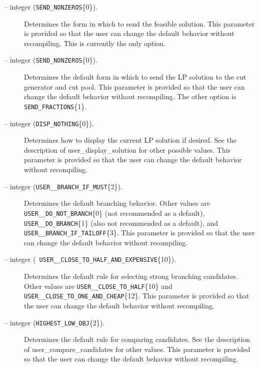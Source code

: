 \begin{description}
\item[ -- integer 
({\tt SEND\_NONZEROS}\{0\}).] 
Determines the form in which to send the feasible solution. This
parameter is provided so that the user can change the default behavior
without recompiling. This is currently the only option.

\item[ -- integer ({\tt SEND\_NONZEROS}\{0\}).] 
Determines the default form in which to send the LP solution to the
cut generator and cut pool. This
parameter is provided so that the user can change the default behavior
without recompiling. The other option is {\tt SEND\_FRACTIONS}\{1\}.

\item[ -- integer ({\tt DISP\_NOTHING}\{0\}).] 
Determines how to display the current LP solution if desired.
See the description of 
{user_display_solution} for other
possible values. This parameter is provided so that
the user can change the default behavior without recompiling.

\item[ -- integer 
({\tt USER\_\_BRANCH\_IF\_MUST}\{2\}).] 
Determines the default branching behavior. Other values are {\tt
USER\_\_DO\_NOT\_BRANCH}\{0\} (not recommended as a default), {\tt
USER\_\_DO\_BRANCH}\{1\} (also not recommended as a default), and {\tt
USER\_\_BRANCH\_IF\_TAILOFF}\{3\}. This
parameter is provided so that the user can change the default behavior
without recompiling.

\item[ -- integer ({\tt
USER\_\_CLOSE\_TO\_HALF\_AND\_EXPENSIVE}\{10\}).] 
Determines the default rule for selecting strong branching candidates.
Other values are {\tt USER\_\_CLOSE\_TO\_HALF}\{10\} and 
{\tt USER\_\_CLOSE\_TO\_ONE\_AND\_CHEAP}\{12\}. This
parameter is provided so that the user can change the default behavior
without recompiling.

\item[ -- integer 
({\tt HIGHEST\_LOW\_OBJ}\{2\}).] 
Determines the default rule for comparing candidates. See the
description of 
{user_compare_candidates} for other values. This
parameter is provided so that the user can change the default behavior
without recompiling.


\end{description}
